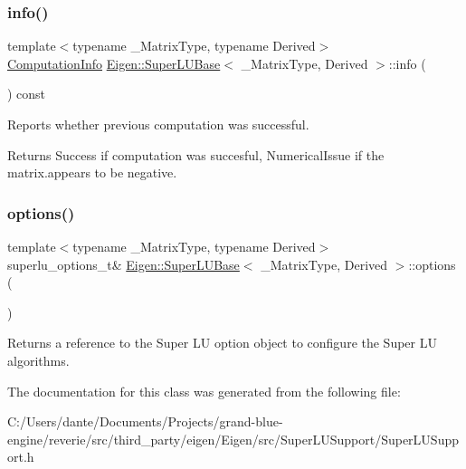 \subsubsection{\texorpdfstring{info()}{info()}}
{\footnotesize\ttfamily template$<$typename \+\_\+\+Matrix\+Type, typename Derived$>$ \\
\mbox{\hyperlink{group__enums_ga85fad7b87587764e5cf6b513a9e0ee5e}{Computation\+Info}} \mbox{\hyperlink{class_eigen_1_1_super_l_u_base}{Eigen\+::\+Super\+L\+U\+Base}}$<$ \+\_\+\+Matrix\+Type, Derived $>$\+::info (\begin{DoxyParamCaption}{ }\end{DoxyParamCaption}) const\hspace{0.3cm}{\ttfamily [inline]}}



Reports whether previous computation was successful. 

\begin{DoxyReturn}{Returns}
{\ttfamily Success} if computation was succesful, {\ttfamily Numerical\+Issue} if the matrix.\+appears to be negative. 
\end{DoxyReturn}
\mbox{\label{class_eigen_1_1_super_l_u_base_a42d9d79073379f1e75b0f2c49879ed5b}} 
\subsubsection{\texorpdfstring{options()}{options()}}
{\footnotesize\ttfamily template$<$typename \+\_\+\+Matrix\+Type, typename Derived$>$ \\
superlu\+\_\+options\+\_\+t\& \mbox{\hyperlink{class_eigen_1_1_super_l_u_base}{Eigen\+::\+Super\+L\+U\+Base}}$<$ \+\_\+\+Matrix\+Type, Derived $>$\+::options (\begin{DoxyParamCaption}{ }\end{DoxyParamCaption})\hspace{0.3cm}{\ttfamily [inline]}}

\begin{DoxyReturn}{Returns}
a reference to the Super LU option object to configure the Super LU algorithms. 
\end{DoxyReturn}


The documentation for this class was generated from the following file\+:\begin{DoxyCompactItemize}
\item 
C\+:/\+Users/dante/\+Documents/\+Projects/grand-\/blue-\/engine/reverie/src/third\+\_\+party/eigen/\+Eigen/src/\+Super\+L\+U\+Support/Super\+L\+U\+Support.\+h\end{DoxyCompactItemize}
